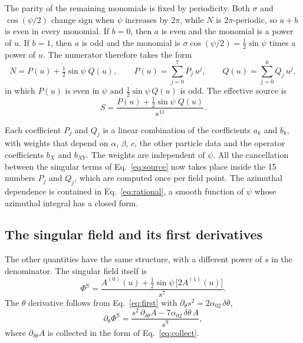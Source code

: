 \documentclass[11pt]{article}
\newcommand{\PhiS}{\Phi^{\mathrm{S}}}
\begin{document}
The parity of the remaining monomials is fixed by periodicity. Both $\sigma$
and $\cos(\psi/2)$ change sign when $\psi$ increases by $2\pi$, while $N$ is
$2\pi$-periodic, so $a+b$ is even in every monomial. If $b=0$, then $a$ is
even and the monomial is a power of $u$. If $b=1$, then $a$ is odd and the
monomial is $\sigma\cos(\psi/2)=\tfrac12\sin\psi$ times a power of $u$. The
numerator therefore takes the form
\begin{equation}
  \label{eq:PQ}
  N = P(u) + \tfrac12\sin\psi\;Q(u), \qquad
  P(u) = \sum_{j=0}^{7} P_j\,u^j, \qquad Q(u) = \sum_{j=0}^{6} Q_j\,u^j ,
\end{equation}
in which $P(u)$ is even in $\psi$ and $\tfrac12\sin\psi\,Q(u)$ is odd. The
effective source is
\begin{equation}
  \label{eq:rational}
  S = \frac{P(u) + \tfrac12\sin\psi\;Q(u)}{s^{11}} .
\end{equation}

Each coefficient $P_j$ and $Q_j$ is a linear combination of the coefficients
$a_k$ and $b_k$, with weights that depend on $\alpha$, $\beta$, $c$, the other
particle data and the operator coefficients $b_X$ and $b_{XY}$. The weights
are independent of $\psi$. All the cancellation between the singular terms of
Eq.~\eqref{eq:source} now takes place inside the 15 numbers $P_j$ and $Q_j$,
which are computed once per field point. The azimuthal dependence is contained
in Eq.~\eqref{eq:rational}, a smooth function of $\psi$ whose azimuthal
integral has a closed form.

\subsection{The singular field and its first derivatives}
\label{sec:fields}

The other quantities have the same structure, with a different power of $s$ in
the denominator. The singular field itself is
\begin{equation}
  \label{eq:PhiS_numerator}
  \PhiS = \frac{A^{(0)}(u) + \tfrac12\sin\psi\,\bigl[2A^{(1)}(u)\bigr]}{s^7}.
\end{equation}
The $\theta$ derivative follows from Eq.~\eqref{eq:first} with
$\partial_\theta s^2 = 2\alpha_{02}\,\delta\theta$,
\begin{equation}
  \label{eq:dth_numerator}
  \partial_\theta\PhiS = \frac{s^2\,\partial_{\delta\theta}A - 7\alpha_{02}\,\delta\theta\,A}{s^9},
\end{equation}
where $\partial_{\delta\theta}A$ is collected in the form of
Eq.~\eqref{eq:collect}.
\end{document}
